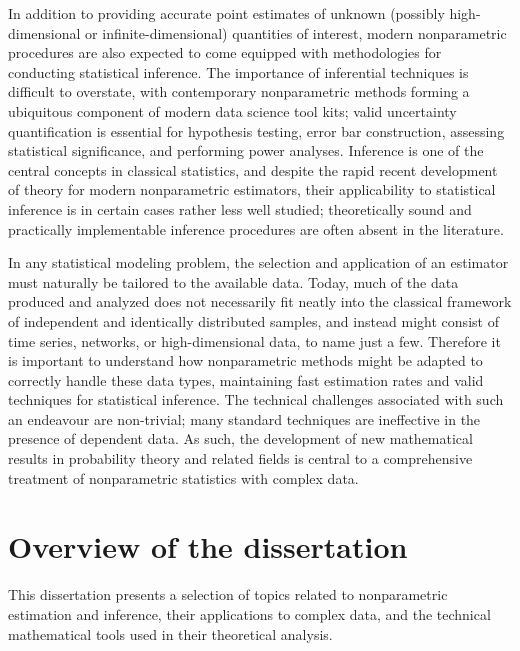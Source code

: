 In addition to providing accurate point estimates of unknown
(possibly high-dimensional or infinite-dimensional) quantities of interest,
modern nonparametric procedures are also expected to come equipped
with methodologies for conducting statistical inference.
The importance of inferential techniques is difficult to overstate,
with contemporary nonparametric methods forming a ubiquitous
component of modern data science tool kits;
valid uncertainty quantification is essential for hypothesis testing,
error bar construction, assessing statistical significance, and
performing power analyses. Inference is one of the central concepts in
classical statistics, and despite the rapid recent development of theory for
modern nonparametric estimators, their applicability to
statistical inference is in certain cases rather less well studied;
theoretically sound and practically implementable
inference procedures are often absent in the literature.

In any statistical modeling problem, the selection and application
of an estimator must
naturally be tailored to the available data. Today, much of the data produced
and analyzed does not necessarily
fit neatly into the classical framework of independent
and identically distributed samples, and instead might consist of time series,
networks, or high-dimensional data, to name just a few. Therefore it is
important to understand how nonparametric methods might be adapted to correctly
handle these data types, maintaining fast estimation rates and valid techniques
for statistical inference.
The technical challenges associated with such an endeavour are non-trivial;
many standard techniques are ineffective in the presence of
dependent data. As such, the development of new
mathematical results in probability theory and related fields
is central to a comprehensive
treatment of nonparametric statistics with complex data.

\section*{Overview of the dissertation}

This dissertation presents a selection of topics related to nonparametric
estimation and inference, their applications to complex data, and the
technical mathematical tools used in their theoretical analysis.

